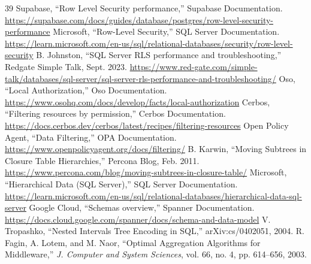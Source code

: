 \documentclass[conference]{IEEEtran}
\begin{document}
\begin{thebibliography}{39}
 Supabase, ``Row Level Security performance,'' Supabase Documentation. \url{https://supabase.com/docs/guides/database/postgres/row-level-security-performance}
 Microsoft, ``Row-Level Security,'' SQL Server Documentation. \url{https://learn.microsoft.com/en-us/sql/relational-databases/security/row-level-security}
 B. Johnston, ``SQL Server RLS performance and troubleshooting,'' Redgate Simple Talk, Sept. 2023. \url{https://www.red-gate.com/simple-talk/databases/sql-server/sql-server-rls-performance-and-troubleshooting/}
 Oso, ``Local Authorization,'' Oso Documentation. \url{https://www.osohq.com/docs/develop/facts/local-authorization}
 Cerbos, ``Filtering resources by permission,'' Cerbos Documentation. \url{https://docs.cerbos.dev/cerbos/latest/recipes/filtering-resources}
 Open Policy Agent, ``Data Filtering,'' OPA Documentation. \url{https://www.openpolicyagent.org/docs/filtering/}
 B. Karwin, ``Moving Subtrees in Closure Table Hierarchies,'' Percona Blog, Feb. 2011. \url{https://www.percona.com/blog/moving-subtrees-in-closure-table/}
 Microsoft, ``Hierarchical Data (SQL Server),'' SQL Server Documentation. \url{https://learn.microsoft.com/en-us/sql/relational-databases/hierarchical-data-sql-server}
 Google Cloud, ``Schemas overview,'' Spanner Documentation. \url{https://docs.cloud.google.com/spanner/docs/schema-and-data-model}
 V. Tropashko, ``Nested Intervals Tree Encoding in SQL,'' arXiv:cs/0402051, 2004.
 R. Fagin, A. Lotem, and M. Naor, ``Optimal Aggregation Algorithms for Middleware,'' \emph{J. Computer and System Sciences}, vol. 66, no. 4, pp. 614--656, 2003.
\end{thebibliography}
\end{document}
